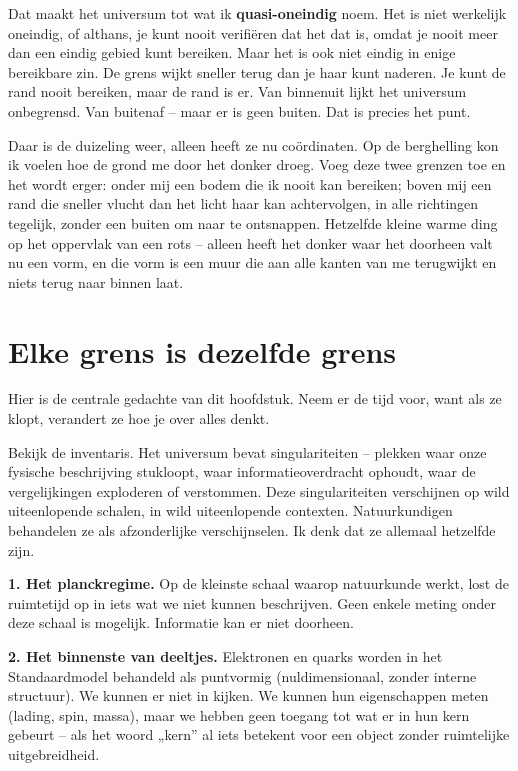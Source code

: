 \documentclass[11pt, twoside, openright]{book}
\begin{document}
Dat maakt het universum tot wat ik \textbf{quasi-oneindig} noem. Het is niet werkelijk oneindig, of althans, je kunt nooit verifiëren dat het dat is, omdat je nooit meer dan een eindig gebied kunt bereiken. Maar het is ook niet eindig in enige bereikbare zin. De grens wijkt sneller terug dan je haar kunt naderen. Je kunt de rand nooit bereiken, maar de rand is er. Van binnenuit lijkt het universum onbegrensd. Van buitenaf -- maar er is geen buiten. Dat is precies het punt.

Daar is de duizeling weer, alleen heeft ze nu coördinaten. Op de berghelling kon ik voelen hoe de grond me door het donker droeg. Voeg deze twee grenzen toe en het wordt erger: onder mij een bodem die ik nooit kan bereiken; boven mij een rand die sneller vlucht dan het licht haar kan achtervolgen, in alle richtingen tegelijk, zonder een buiten om naar te ontsnappen. Hetzelfde kleine warme ding op het oppervlak van een rots -- alleen heeft het donker waar het doorheen valt nu een vorm, en die vorm is een muur die aan alle kanten van me terugwijkt en niets terug naar binnen laat.


\section*{Elke grens is dezelfde grens}

Hier is de centrale gedachte van dit hoofdstuk. Neem er de tijd voor, want als ze klopt, verandert ze hoe je over alles denkt.

Bekijk de inventaris. Het universum bevat singulariteiten -- plekken waar onze fysische beschrijving stukloopt, waar informatieoverdracht ophoudt, waar de vergelijkingen exploderen of verstommen. Deze singulariteiten verschijnen op wild uiteenlopende schalen, in wild uiteenlopende contexten. Natuurkundigen behandelen ze als afzonderlijke verschijnselen. Ik denk dat ze allemaal hetzelfde zijn.

\textbf{1. Het planckregime.} Op de kleinste schaal waarop natuurkunde werkt, lost de ruimtetijd op in iets wat we niet kunnen beschrijven. Geen enkele meting onder deze schaal is mogelijk. Informatie kan er niet doorheen.

\textbf{2. Het binnenste van deeltjes.} Elektronen en quarks worden in het Standaardmodel behandeld als puntvormig (nuldimensionaal, zonder interne structuur). We kunnen er niet in kijken. We kunnen hun eigenschappen meten (lading, spin, massa), maar we hebben geen toegang tot wat er in hun kern gebeurt -- als het woord „kern” al iets betekent voor een object zonder ruimtelijke uitgebreidheid.
\end{document}
